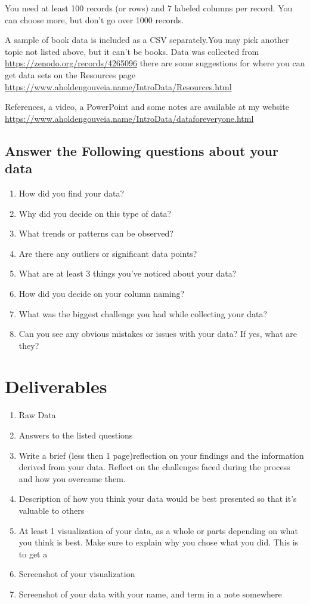 \documentclass[12pt]{article}
\begin{document}
You need at least 100 records (or rows) and 7 labeled columns per record. You can choose more, but don't go over 1000 records.

A sample of book data is included as a CSV separately.You may pick another topic not listed above, but it can't be books. Data was collected from \url {https://zenodo.org/records/4265096} there are some suggestions for where you can get data sets on the Resources page \url{https://www.aholdengouveia.name/IntroData/Resources.html}



References, a video, a PowerPoint and some notes are available at my website \url {https://www.aholdengouveia.name/IntroData/dataforeveryone.html}

\subsection*{Answer the Following questions about your data}
    \begin{enumerate}
        \item How did you find your data?
        \item Why did you decide on this type of data?
        \item What trends or patterns can be observed?
        \item Are there any outliers or significant data points?
        \item What are at least 3 things you've noticed about your data? 
        \item How did you decide on your column naming?
        \item What was the biggest challenge you had while collecting your data?
        \item Can you see any obvious mistakes or issues with your data? If yes, what are they?
    \end{enumerate}



\section*{Deliverables}
\begin{enumerate}
    \item Raw Data
    \item Answers to the listed questions
    \item Write a brief (less then 1 page)reflection on your findings and the information derived from your data.  Reflect on the challenges faced during the process and how you overcame them.
    \item Description of how you think your data would be best presented so that it's valuable to others
    \item At least 1 visualization of your data, as a whole or parts depending on what you think is best.  Make sure to explain why you chose what you did. This is to get a 
    \item Screenshot of your visualization
    \item Screenshot of your data with your name, and term in a note somewhere
\end{enumerate}
\end{document}

